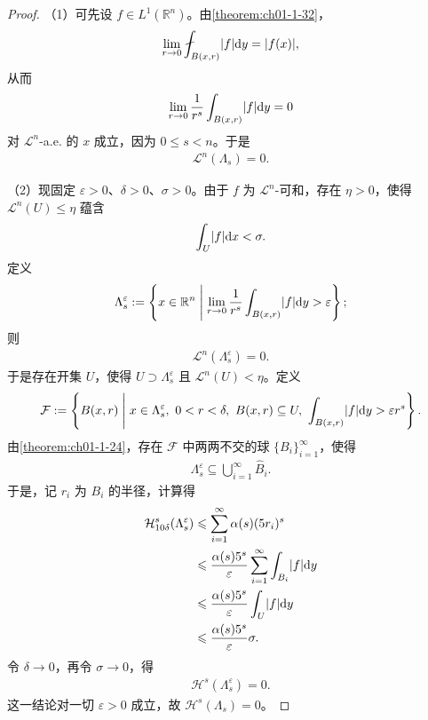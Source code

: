 \documentclass[../../main.tex]{subfiles}%
\begin{document}
\begin{proof}
（1）可先设 $f\in L^1(\mathbb{R}^n)$。由\cref{theorem:ch01-1-32}，%
\begin{align*}
\lim_{r\to0}\fint_{B(x,r)}\lvert f\rvert\diff y=\lvert f(x)\rvert ,
\end{align*}
从而
\begin{align*}
\lim_{r\to0}\frac{1}{r^s}\int_{B(x,r)}\lvert f\rvert\mathrm{d} y=0
\end{align*}
对 $\mathcal{L}^n$-a.e. 的 $x$ 成立，因为 $0\leqslant s<n$。于是
\begin{align*}
\mathcal{L}^n(\Lambda_s)=0 .
\end{align*}

（2）现固定 $\varepsilon>0$、$\delta>0$、$\sigma>0$。由于 $f$ 为 $\mathcal{L}^n$-可和，存在 $\eta>0$，使得 $\mathcal{L}^n(U)\leqslant\eta$ 蕴含
\begin{align*}
\int_U\lvert f\rvert\mathrm{d} x<\sigma .
\end{align*}
定义
\begin{align*}
\Lambda_s^\varepsilon:=\left\{x\in\mathbb{R}^n\Biggm|\lim_{r\to0}\frac{1}{r^s}\int_{B(x,r)}\lvert f\rvert\mathrm{d} y>\varepsilon\right\};
\end{align*}
则
\begin{align*}
\mathcal{L}^n(\Lambda_s^\varepsilon)=0 .
\end{align*}
于是存在开集 $U$，使得 $U\supset\Lambda_s^\varepsilon$ 且 $\mathcal{L}^n(U)<\eta$。定义
\begin{align*}
\mathcal{F}:=\left\{B(x,r)\Biggm|x\in\Lambda_s^\varepsilon,\ 0<r<\delta,\ B(x,r)\subseteq U,\ \int_{B(x,r)}\lvert f\rvert\diff y>\varepsilon r^s\right\}.
\end{align*}
由\cref{theorem:ch01-1-24}，存在 $\mathcal{F}$ 中两两不交的球 $\{B_i\}_{i=1}^{\infty}$，使得%
\begin{align*}
\Lambda_s^\varepsilon\subseteq\bigcup_{i=1}^{\infty}\hat B_i .
\end{align*}
于是，记 $r_i$ 为 $B_i$ 的半径，计算得
\begin{align*}
\mathcal{H}^s_{10\delta}(\Lambda_s^\varepsilon)
&\leqslant\sum_{i=1}^{\infty}\alpha(s)(5r_i)^s\\
&\leqslant\frac{\alpha(s)5^s}{\varepsilon}\sum_{i=1}^{\infty}\int_{B_i}\lvert f\rvert\mathrm{d} y\\
&\leqslant\frac{\alpha(s)5^s}{\varepsilon}\int_U\lvert f\rvert\mathrm{d} y\\
&\leqslant\frac{\alpha(s)5^s}{\varepsilon}\sigma .
\end{align*}
令 $\delta\to0$，再令 $\sigma\to0$，得
\begin{align*}
\mathcal{H}^s(\Lambda_s^\varepsilon)=0 .
\end{align*}
这一结论对一切 $\varepsilon>0$ 成立，故 $\mathcal{H}^s(\Lambda_s)=0$。
\end{proof}
\end{document}
